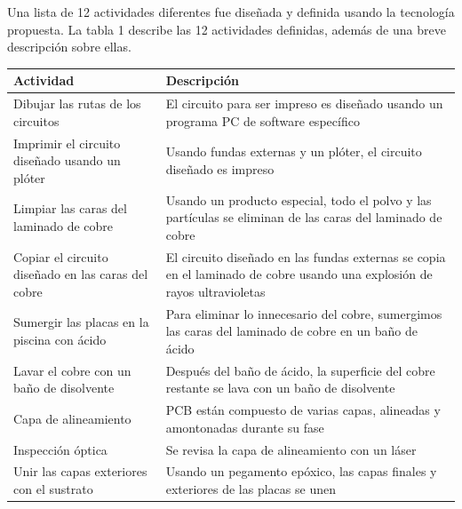 \documentclass{article}
\begin{document}
Una lista de 12 actividades diferentes fue diseñada y definida usando la tecnología propuesta. La tabla 1 describe las 12 actividades definidas, además de una breve descripción sobre ellas. 

\begin{table}[h]
	\begin{center}
		\begin{tabular}{ | p{4cm} | p{9cm} | }
			\hline Actividad                                   & Descripción                                                                                                              \\ \hline
			Dibujar las rutas de los circuitos                 & El circuito para ser impreso es diseñado usando un programa PC de software específico                                    \\ \hline
			Imprimir el circuito diseñado usando un plóter     & Usando fundas externas y un plóter, el circuito diseñado es impreso                                                      \\ \hline
			Limpiar las caras del laminado de cobre            & Usando un producto especial, todo el polvo y las partículas se eliminan de las caras del laminado de cobre               \\ \hline
			Copiar el circuito diseñado en las caras del cobre & El circuito diseñado en las fundas externas se copia en el laminado de cobre usando una explosión de rayos ultravioletas \\ \hline
			Sumergir las placas en la piscina con ácido        & Para eliminar lo innecesario del cobre, sumergimos las caras del laminado de cobre en un baño de ácido                   \\ \hline
			Lavar el cobre con un baño de disolvente           & Después del baño de ácido, la superficie del cobre restante se lava con un baño de disolvente                            \\ \hline
			Capa de alineamiento                               & PCB están compuesto de varias capas, alineadas y amontonadas durante su fase                                             \\ \hline
			Inspección óptica                                  & Se revisa la capa de alineamiento con un láser                                                                           \\ \hline
			Unir las capas exteriores con el sustrato          & Usando un pegamento epóxico, las capas finales y exteriores de las placas se unen                                        \\ \hline

\end{tabular}
\end{center}
\end{table}
\end{document}
